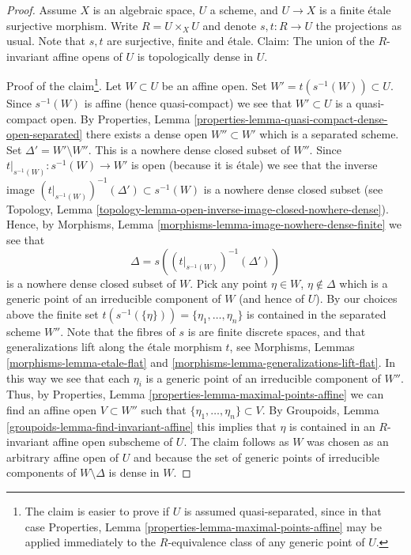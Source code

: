 \begin{proof}
Assume $X$ is an algebraic space, $U$ a scheme, and $U \to X$ is a finite
\'etale surjective morphism. Write $R = U \times_X U$ and denote
$s, t : R \to U$ the projections as usual. Note that $s, t$ are surjective,
finite and \'etale. Claim: The union of the $R$-invariant affine opens of
$U$ is topologically dense in $U$.

\medskip\noindent
Proof of the claim\footnote{The claim is easier to prove if
$U$ is assumed quasi-separated, since in that case
Properties, Lemma \ref{properties-lemma-maximal-points-affine}
may be applied immediately to the $R$-equivalence class of any
generic point of $U$.}. Let $W \subset U$ be an affine open.
Set $W' = t(s^{-1}(W)) \subset U$. Since $s^{-1}(W)$ is affine
(hence quasi-compact) we see that $W' \subset U$ is a quasi-compact open. By
Properties, Lemma \ref{properties-lemma-quasi-compact-dense-open-separated}
there exists a dense open $W'' \subset W'$ which is a separated scheme.
Set $\Delta' = W' \setminus W''$. This is a nowhere dense closed subset of
$W''$. Since $t|_{s^{-1}(W)} : s^{-1}(W) \to W'$ is open (because it is \'etale)
we see that the inverse image
$(t|_{s^{-1}(W)})^{-1}(\Delta') \subset s^{-1}(W)$
is a nowhere dense closed subset (see
Topology, Lemma \ref{topology-lemma-open-inverse-image-closed-nowhere-dense}).
Hence, by
Morphisms, Lemma \ref{morphisms-lemma-image-nowhere-dense-finite}
we see that
$$
\Delta = s\left((t|_{s^{-1}(W)})^{-1}(\Delta')\right)
$$
is a nowhere dense closed subset of $W$. Pick any point $\eta \in W$,
$\eta \not \in \Delta$ which is a generic point of an irreducible
component of $W$ (and hence of $U$). By our choices above the finite set
$t(s^{-1}(\{\eta\})) = \{\eta_1, \ldots, \eta_n\}$
is contained in the separated scheme $W''$.
Note that the fibres of $s$ is are finite discrete spaces, and that
generalizations lift along the \'etale morphism $t$, see
Morphisms, Lemmas \ref{morphisms-lemma-etale-flat}
and \ref{morphisms-lemma-generalizations-lift-flat}.
In this way we see that each $\eta_i$ is a generic point of an
irreducible component of $W''$. Thus, by
Properties, Lemma \ref{properties-lemma-maximal-points-affine}
we can find an affine open $V \subset W''$ such that
$\{\eta_1, \ldots, \eta_n\} \subset V$.
By
Groupoids, Lemma \ref{groupoids-lemma-find-invariant-affine}
this implies that $\eta$ is contained in an $R$-invariant affine
open subscheme of $U$. The claim follows as $W$ was chosen as an
arbitrary affine open of $U$ and because the set of generic points
of irreducible components of $W \setminus \Delta$ is dense in $W$.


\end{proof}
